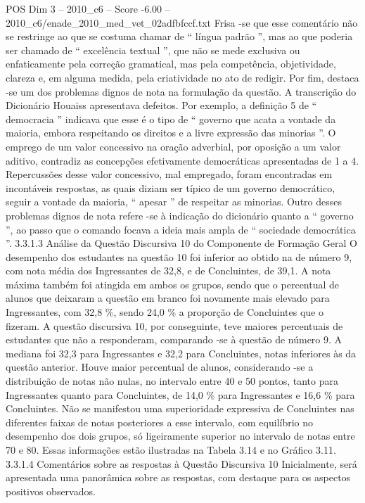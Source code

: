 \begin{textsample}{POS Dim 3 – 2010\_c6 – Score -6.00 – 2010\_c6/enade\_2010\_med\_vet\_02adfbfccf.txt}
Frisa -se que esse comentário não se restringe ao que se costuma chamar de “ língua padrão ”, mas ao que poderia ser chamado de “ excelência textual ”, que não se mede exclusiva ou enfaticamente pela correção gramatical, mas pela competência, objetividade, clareza e, em alguma medida, pela criatividade no ato de redigir.
Por fim, destaca -se um dos problemas dignos de nota na formulação da questão.
A transcrição do Dicionário Houaiss apresentava defeitos.
Por exemplo, a definição 5 de “ democracia ” indicava que esse é o tipo de “ governo que acata a vontade da maioria, embora respeitando os direitos e a livre expressão das minorias ”.
O emprego de um valor concessivo na oração adverbial, por oposição a um valor aditivo, contradiz as concepções efetivamente democráticas apresentadas de 1 a 4.
Repercussões desse valor concessivo, mal empregado, foram encontradas em incontáveis respostas, as quais diziam ser típico de um governo democrático, seguir a vontade da maioria, “ apesar ” de respeitar as minorias.
Outro desses problemas dignos de nota refere -se à indicação do dicionário quanto a “ governo ”, ao passo que o comando focava a ideia mais ampla de “ sociedade democrática ”. 3.3.1.3 Análise da Questão Discursiva 10 do Componente de Formação Geral O desempenho dos estudantes na questão 10 foi inferior ao obtido na de número 9, com nota média dos Ingressantes de 32,8, e de Concluintes, de 39,1.
A nota máxima também foi atingida em ambos os grupos, sendo que o percentual de alunos que deixaram a questão em branco foi novamente mais elevado para Ingressantes, com 32,8 \%, sendo 24,0 \% a proporção de Concluintes que o fizeram.
A questão discursiva 10, por conseguinte, teve maiores percentuais de estudantes que não a responderam, comparando -se à questão de número 9.
A mediana foi 32,3 para Ingressantes e 32,2 para Concluintes, notas inferiores às da questão anterior.
Houve maior percentual de alunos, considerando -se a distribuição de notas não nulas, no intervalo entre 40 e 50 pontos, tanto para Ingressantes quanto para Concluintes, de 14,0 \% para Ingressantes e 16,6 \% para Concluintes.
Não se manifestou uma superioridade expressiva de Concluintes nas diferentes faixas de notas posteriores a esse intervalo, com equilíbrio no desempenho dos dois grupos, só ligeiramente superior no intervalo de notas entre 70 e 80.
Essas informações estão ilustradas na Tabela 3.14 e no Gráfico 3.11. 3.3.1.4 Comentários sobre as respostas à Questão Discursiva 10 Inicialmente, será apresentada uma panorâmica sobre as respostas, com destaque para os aspectos positivos observados.

\end{textsample}
